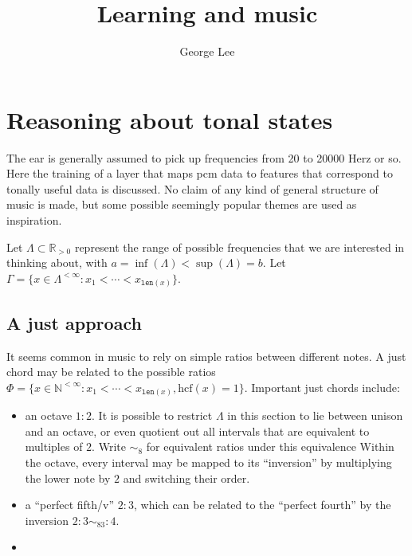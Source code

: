 \documentclass[10pt,a4paper]{article}
\title{Learning and music}
\author{George Lee}
\begin{document}
\maketitle
\section{Reasoning about tonal states}
The ear is generally assumed to pick up frequencies from 20 to 20000 Herz or so.
Here the training of a layer that maps pcm data to features that correspond to tonally useful data is discussed.
No claim of any kind of general structure of music is made, but some possible seemingly popular themes are used as inspiration.

Let $\Lambda\subset\mathbb R_{>0}$ represent the range of possible frequencies that we are interested in thinking about, with $a=\inf(\Lambda)<\sup(\Lambda)=b$.
Let $\Gamma=\{x\in\Lambda^{<\infty}:x_1<\cdots<x_{\texttt{len}(x)}\}$.
\subsection{A just approach}
It seems common in music to rely on simple ratios between different notes.
A just chord may be related to the possible ratios $\Phi=\{x\in\mathbb N^{<\infty}:x_1<\cdots<x_{\texttt{len}(x)},\text{hcf}(x)=1\}$.
Important just chords include:
\begin{itemize}
  \item an octave $1:2$.
    It is possible to restrict $\Lambda$ in this section to lie between unison and an octave, or even quotient out all intervals that are equivalent to multiples of $2$.
    Write $\sim_8$ for equivalent ratios under this equivalence
    Within the octave, every interval may be mapped to its ``inversion'' by multiplying the lower note by $2$ and switching their order.
  \item a ``perfect fifth/v'' $2:3$, which can be related to the ``perfect fourth'' by the inversion $2:3\sim_83:4$.
  \item 
\end{itemize}
\end{document}
